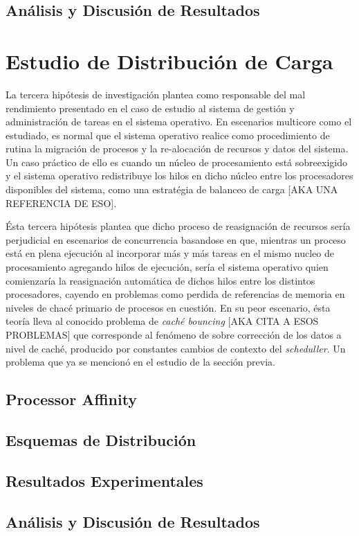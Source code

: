 \subsection{Análisis y Discusión de Resultados}

\section{Estudio de Distribución de Carga}
La tercera hipótesis de investigación plantea como responsable del mal rendimiento presentado en el caso de estudio al sistema de gestión y administración de tareas en el sistema operativo. En escenarios multicore como el estudiado, es normal que el sistema operativo realice como procedimiento de rutina la migración de procesos y la re-alocación de recursos y datos del sistema. Un caso práctico de ello es cuando un núcleo de procesamiento está sobreexigido y el sistema operativo redistribuye los hilos en dicho núcleo entre los procesadores disponibles del sistema, como una estratégia de balanceo de carga [AKA UNA REFERENCIA DE ESO].

Ésta tercera hipótesis plantea que dicho proceso de reasignación de recursos sería perjudicial en escenarios de concurrencia basandose en que, mientras un proceso está en plena ejecución al incorporar más y más tareas en el mismo nucleo de procesamiento agregando hilos de ejecución, sería el sistema operativo quien comienzaría la reasignación automática de dichos hilos entre los distintos procesadores, cayendo en problemas como perdida de referencias de memoria en niveles de chacé primario de procesos en cuestión. En su peor escenario, ésta teoría lleva al conocido problema de \emph{caché bouncing} [AKA CITA A ESOS PROBLEMAS] que corresponde al fenómeno de sobre corrección de los datos a nivel de caché, producido por constantes cambios de contexto del \emph{scheduller}. Un problema que ya se mencionó en el estudio de la sección previa.

\subsection{Processor Affinity}
\subsection{Esquemas de Distribución}
\subsection{Resultados Experimentales}
\subsection{Análisis y Discusión de Resultados}